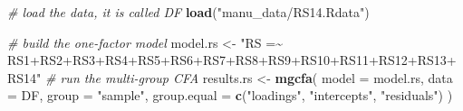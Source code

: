 \documentclass[
  man]{apa7}
\newenvironment{Shaded}{\begin{snugshade}}{\end{snugshade}}
\newcommand{\AttributeTok}[1]{\textcolor[rgb]{0.13,0.29,0.53}{#1}}
\newcommand{\CommentTok}[1]{\textcolor[rgb]{0.56,0.35,0.01}{\textit{#1}}}
\newcommand{\FunctionTok}[1]{\textcolor[rgb]{0.13,0.29,0.53}{\textbf{#1}}}
\newcommand{\NormalTok}[1]{#1}
\newcommand{\OtherTok}[1]{\textcolor[rgb]{0.56,0.35,0.01}{#1}}
\newcommand{\SpecialCharTok}[1]{\textcolor[rgb]{0.81,0.36,0.00}{\textbf{#1}}}
\newcommand{\StringTok}[1]{\textcolor[rgb]{0.31,0.60,0.02}{#1}}
\begin{document}
\begin{Shaded}
\begin{Highlighting}[]
\CommentTok{\# load the data, it is called DF}
\FunctionTok{load}\NormalTok{(}\StringTok{"manu\_data/RS14.Rdata"}\NormalTok{)}

\CommentTok{\# build the one{-}factor model }
\NormalTok{model.rs }\OtherTok{\textless{}{-}} \StringTok{"RS =\textasciitilde{} RS1+RS2+RS3+RS4+RS5+RS6+RS7+RS8+RS9+RS10+RS11+RS12+RS13+RS14"}
\CommentTok{\# run the multi{-}group CFA}
\NormalTok{results.rs }\OtherTok{\textless{}{-}} \FunctionTok{mgcfa}\NormalTok{(}
  \AttributeTok{model =}\NormalTok{ model.rs,}
  \AttributeTok{data =}\NormalTok{ DF, }
  \AttributeTok{group =} \StringTok{"sample"}\NormalTok{, }
  \AttributeTok{group.equal =} \FunctionTok{c}\NormalTok{(}\StringTok{"loadings"}\NormalTok{, }\StringTok{"intercepts"}\NormalTok{, }\StringTok{"residuals"}\NormalTok{)}
\NormalTok{  )}
\end{Highlighting}
\end{Shaded}

\normalsize

\small

\begin{Shaded}
\end{Shaded}

\normalsize
\end{document}
